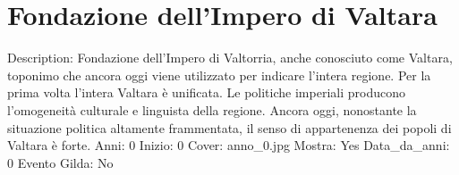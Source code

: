 \section{Fondazione dell'Impero di
Valtara}\label{fondazione-dellimpero-di-valtara}

Description: Fondazione dell'Impero di Valtorria, anche conosciuto come
Valtara, toponimo che ancora oggi viene utilizzato per indicare l'intera
regione. Per la prima volta l'intera Valtara è unificata. Le politiche
imperiali producono l'omogeneità culturale e linguista della regione.
Ancora oggi, nonostante la situazione politica altamente frammentata, il
senso di appartenenza dei popoli di Valtara è forte. Anni: 0 Inizio: 0
Cover: anno\_0.jpg Mostra: Yes Data\_da\_anni: 0 Evento Gilda: No
